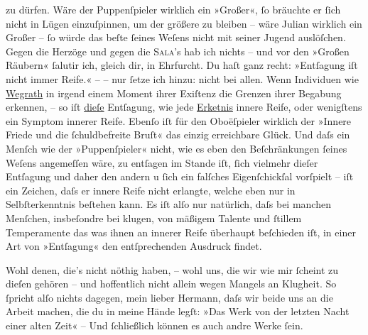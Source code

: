                zu dürfen. Wäre der Puppen{\pb}ſpieler
               wirklich ein »Großer«, ſo bräuchte er ſich nicht in Lügen einzuſpinnen, um der
               größere zu bleiben – wäre Julian wirklich ein Großer – ſo würde das beſte ſeines Weſens nicht mit
               seiner Jugend auslöſchen. Gegen die Herzöge und gegen die \textsc{Sala}’s hab ich nichts – und vor den »Großen Räubern« ſalutir ich, gleich dir, in
               Ehrfurcht. Du haſt ganz recht: »Entſagung iſt nicht immer Reife.« – – nur ſetze ich
               hinzu: nicht bei allen. Wenn Individuen wie \uline{Wegrath} in irgend einem Moment ihrer Exiſtenz die Grenzen ihrer Begabung erkennen, –
                  {\pb}so iſt \uline{dieſe} Entſagung, wie jede \uline{Erke{\geminationn}tnis} innere Reife, oder wenigſtens ein
               Symptom innerer Reife. Ebenſo iſt für den Oboëſpieler wirklich der »Innere Friede und
               die ſchuldbefreite Bruſt« das einzig erreichbare Glück. Und daſs ein Menſch wie der
                  »Puppenſpieler« nicht, wie
               es eben den Beſchränkungen ſeines Weſens angemeſſen wäre, \introOben{}zu\introOben{}
               entſagen im Stande iſt, ſich \introOben{}vielmehr\introOben{} dieſer Entſagung
               und daher den andern u ſich ein \introOben{}falſches\introOben{} Eigenſchickſal
               vorſpielt – iſt ein Zeichen, daſs er innere Reife nicht erlangte, welche eben nur in
               Selbſterkenntnis beſtehen kann.  Es iſt {\pb}alſo nur natürlich,
               daſs bei manchen Menſchen, insbeſondre bei klugen, von mäßigem Talente und ſtillem
               Temperamente das was ihnen an innerer Reife überhaupt beſchieden iſt, in einer Art
               von »Entſagung« den entſprechenden Ausdruck findet.\pend
           
\pstart
           Wohl denen, die’s nicht nöthig haben, – wohl uns, die wir wie mir ſcheint zu dieſen
               gehören – und hoffentlich nicht allein wegen Mangels an Klugheit. So ſpricht alſo
               nichts dagegen, mein lieber Hermann, daſs wir beide uns an die Arbeit machen, die du
               in meine {\pb}Hände legſt:
                  »\label{LL075-1v}Das Werk von der letzten Nacht einer alten
                  Zeit\label{LL075-1h}« – Und ſchließlich können es auch andre Werke ſein.\pend
           
